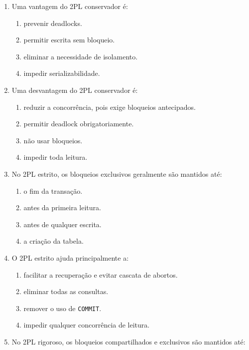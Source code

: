 \documentclass[12pt,a4paper]{article}
\begin{document}
\begin{enumerate}[label=\textbf{Q\arabic*.}]
\item Uma vantagem do 2PL conservador é:

\begin{enumerate}[label=\alph*)]
    \item prevenir deadlocks.
    \item permitir escrita sem bloqueio.
    \item eliminar a necessidade de isolamento.
    \item impedir serializabilidade.
\end{enumerate}

\item Uma desvantagem do 2PL conservador é:

\begin{enumerate}[label=\alph*)]
    \item reduzir a concorrência, pois exige bloqueios antecipados.
    \item permitir deadlock obrigatoriamente.
    \item não usar bloqueios.
    \item impedir toda leitura.
\end{enumerate}

\item No 2PL estrito, os bloqueios exclusivos geralmente são mantidos até:

\begin{enumerate}[label=\alph*)]
    \item o fim da transação.
    \item antes da primeira leitura.
    \item antes de qualquer escrita.
    \item a criação da tabela.
\end{enumerate}

\item O 2PL estrito ajuda principalmente a:

\begin{enumerate}[label=\alph*)]
    \item facilitar a recuperação e evitar cascata de abortos.
    \item eliminar todas as consultas.
    \item remover o uso de \texttt{COMMIT}.
    \item impedir qualquer concorrência de leitura.
\end{enumerate}

\item No 2PL rigoroso, os bloqueios compartilhados e exclusivos são mantidos até:


\end{enumerate}
\end{document}
